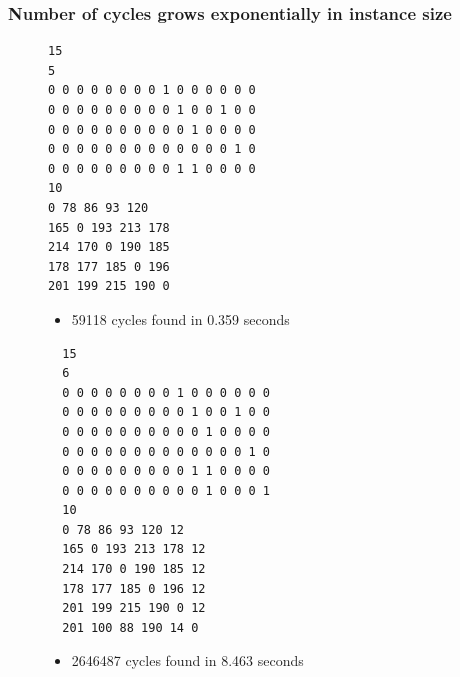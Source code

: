 \documentclass{beamer}
\begin{document}
\begin{frame}[fragile]
  \frametitle{Number of cycles grows exponentially in instance size}
\begin{figure}
\begin{minipage}{0.45\textwidth}
\footnotesize{\begin{verbatim}
15
5
0 0 0 0 0 0 0 0 1 0 0 0 0 0 0
0 0 0 0 0 0 0 0 0 1 0 0 1 0 0
0 0 0 0 0 0 0 0 0 0 1 0 0 0 0
0 0 0 0 0 0 0 0 0 0 0 0 0 1 0
0 0 0 0 0 0 0 0 0 1 1 0 0 0 0
10
0 78 86 93 120
165 0 193 213 178
214 170 0 190 185
178 177 185 0 196
201 199 215 190 0
\end{verbatim}
  }
\begin{itemize}
  \item 59118 cycles found in 0.359 seconds
\end{itemize}
\end{minipage}
\hfill
\begin{minipage}{0.45\textwidth}
  \footnotesize{\begin{verbatim}
  15
  6
  0 0 0 0 0 0 0 0 1 0 0 0 0 0 0
  0 0 0 0 0 0 0 0 0 1 0 0 1 0 0
  0 0 0 0 0 0 0 0 0 0 1 0 0 0 0
  0 0 0 0 0 0 0 0 0 0 0 0 0 1 0
  0 0 0 0 0 0 0 0 0 1 1 0 0 0 0
  0 0 0 0 0 0 0 0 0 0 1 0 0 0 1
  10
  0 78 86 93 120 12
  165 0 193 213 178 12
  214 170 0 190 185 12
  178 177 185 0 196 12
  201 199 215 190 0 12
  201 100 88 190 14 0
\end{verbatim}
  }
  \begin{itemize}
    \item 2646487 cycles found in 8.463 seconds
  \end{itemize}
\end{minipage}
\end{figure}
\end{frame}
\end{document}
